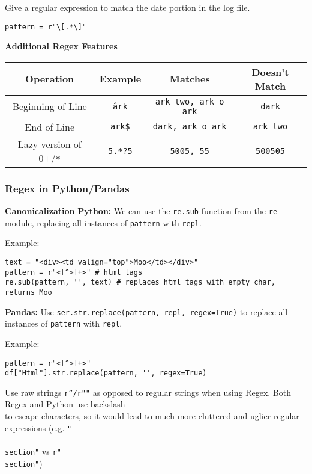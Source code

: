 \begin{example}{Give a regular expression to match the date portion in the log file.
\tcbline
\begin{verbatim}
pattern = r"\[.*\]"
\end{verbatim}
}
\end{example}

\textbf{Additional Regex Features}
\begin{center}
\begin{tabular}{@{}cccc@{}}
\toprule
    Operation & Example & Matches & Doesn't Match \\
\midrule
    Beginning of Line & \texttt{\^ark} & \texttt{ark two, ark o ark} & \texttt{dark} \\
    End of Line & \texttt{ark\$} & \texttt{dark, ark o ark} & \texttt{ark two} \\
    Lazy version of 0+/\texttt{*} & \texttt{5.*?5} & \texttt{5005, 55} & \texttt{500505} \\
\bottomrule
\end{tabular}
\end{center}

\subsubsection{Regex in Python/Pandas}

\textbf{Canonicalization}
\textbf{Python: }We can use the \texttt{re.sub} function from the \texttt{re} module, replacing all instances of \texttt{pattern} with \texttt{repl}.

Example: 
\begin{verbatim}
text = "<div><td valign="top">Moo</td></div>"
pattern = r"<[^>]+>" # html tags
re.sub(pattern, '', text) # replaces html tags with empty char, returns Moo
\end{verbatim}

\textbf{Pandas:} Use \texttt{ser.str.replace(pattern, repl, regex=True)} to replace all instances of \texttt{pattern} with \texttt{repl}.

Example:
\begin{verbatim}
pattern = r"<[^>]+>"
df["Html"].str.replace(pattern, '', regex=True)
\end{verbatim}

\begin{notebox}
Use raw strings \texttt{r''/r""} as opposed to regular strings when using Regex. Both Regex and Python use backslash \texttt{\\} to escape characters, so it would lead to much more cluttered and uglier regular expressions (e.g. \texttt{"\\\\section"} vs \texttt{r"\\section"})
\end{notebox}

